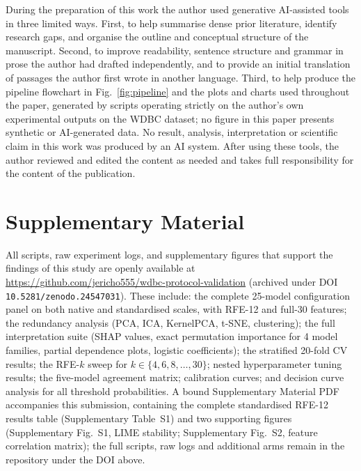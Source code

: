 \documentclass[review,12pt]{elsarticle}
\begin{document}
During the preparation of this work the author used generative AI-assisted tools in three limited ways. First, to help summarise dense prior literature, identify research gaps, and organise the outline and conceptual structure of the manuscript. Second, to improve readability, sentence structure and grammar in prose the author had drafted independently, and to provide an initial translation of passages the author first wrote in another language. Third, to help produce the pipeline flowchart in Fig.~\ref{fig:pipeline} and the plots and charts used throughout the paper, generated by scripts operating strictly on the author's own experimental outputs on the WDBC dataset; no figure in this paper presents synthetic or AI-generated data. No result, analysis, interpretation or scientific claim in this work was produced by an AI system. After using these tools, the author reviewed and edited the content as needed and takes full responsibility for the content of the publication.

\section*{Supplementary Material}

All scripts, raw experiment logs, and supplementary figures that support the findings of this study are openly available at \url{https://github.com/jericho555/wdbc-protocol-validation} (archived under DOI \texttt{10.5281/zenodo.24547031}). These include: the complete 25-model configuration panel on both native and standardised scales, with RFE-12 and full-30 features; the redundancy analysis (PCA, ICA, KernelPCA, t-SNE, clustering); the full interpretation suite (SHAP values, exact permutation importance for 4 model families, partial dependence plots, logistic coefficients); the stratified 20-fold CV results; the RFE-$k$ sweep for $k \in \{4, 6, 8, \ldots, 30\}$; nested hyperparameter tuning results; the five-model agreement matrix; calibration curves; and decision curve analysis for all threshold probabilities. A bound Supplementary Material PDF accompanies this submission, containing the complete standardised RFE-12 results table (Supplementary Table~S1) and two supporting figures (Supplementary Fig.~S1, LIME stability; Supplementary Fig.~S2, feature correlation matrix); the full scripts, raw logs and additional arms remain in the repository under the DOI above.



\end{document}
